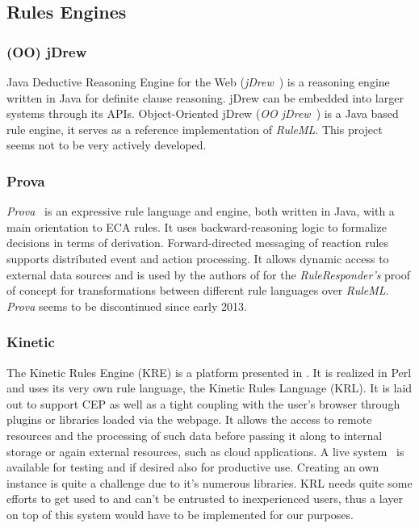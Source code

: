 \documentclass[11pt]{article}%
\begin{document}
\subsection{Rules Engines}
\subsubsection{(OO) jDrew}
Java Deductive Reasoning Engine for the Web (\emph{jDrew}~\cite{wwwjdrew}) is a reasoning engine written in Java for definite clause reasoning. jDrew can be embedded into larger systems through its APIs.
Object-Oriented jDrew (\emph{OO jDrew}~\cite{2005-Ball_etal-OOjDrew.pdf,wwwoojdrew}) is a Java based rule engine, it serves as a reference implementation of \emph{RuleML}. This project seems not to be very actively developed.

\subsubsection{Prova}
\emph{Prova}~\cite{wwwprova} is an expressive rule language and engine, both written in Java, with a main orientation to ECA rules. It uses backward-reasoning logic to formalize decisions in terms of derivation. Forward-directed messaging of reaction rules supports distributed event and action processing. It allows dynamic access to external data sources and is used by the authors of \cite{2013_Zhao-Paschke_EDSWE.pdf,2007-Paschke_etal-RuleResponder.pdf} for the \emph{RuleResponder's} proof of concept for transformations between different rule languages over \emph{RuleML}. \emph{Prova} seems to be discontinued since early 2013. 

\subsubsection{Kinetic}
The Kinetic Rules Engine (KRE) is a platform presented in \cite{bookTheLiveWeb}. It is realized in Perl and uses its very own rule language, the Kinetic Rules Language (KRL). It is laid out to support CEP as well as a tight coupling with the user's browser through plugins or libraries loaded via the webpage. It allows the access to remote resources and the processing of such data before passing it along to internal storage or again external resources, such as cloud applications. A live system~\cite{wwwkynetx} is available for testing and if desired also for productive use. Creating an own instance is quite a challenge due to it's numerous libraries. KRL needs quite some efforts to get used to and can't be entrusted to inexperienced users, thus a layer on top of this system would have to be implemented for our purposes.
\end{document}
